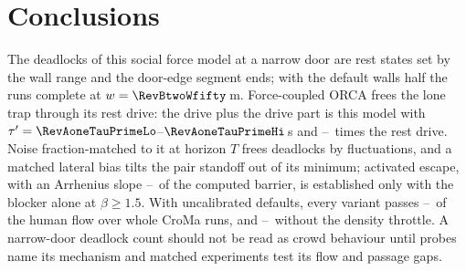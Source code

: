 \section{Conclusions}\label{sec:conclusions}
The deadlocks of this social force model at a narrow door are rest states set by the wall range and the door-edge segment ends; with the default walls half the runs complete at $w=\RevBtwoWfifty$\,m. Force-coupled ORCA frees the lone trap through its rest drive: the drive plus the drive part is this model with $\tau'=\RevAoneTauPrimeLo$--$\RevAoneTauPrimeHi$\,s and \RevAoneDriveRatioLo--\RevAoneDriveRatioHi\ times the rest drive. Noise fraction-matched to it at horizon $T$ frees deadlocks by fluctuations, and a matched lateral bias tilts the pair standoff out of its minimum; activated escape, with an Arrhenius slope \RvAthreeRatioDeep--\RvAthreeRatioMid\ of the computed barrier, is established only with the blocker alone at $\beta\ge1.5$. With uncalibrated defaults, every variant passes \RevDThreeRatioMin--\RevDThreeRatioMax\ of the human flow over whole CroMa runs, and \RvBoneCroOffMin--\RvBoneCroOffMax\ without the density throttle. A narrow-door deadlock count should not be read as crowd behaviour until probes name its mechanism and matched experiments test its flow and passage gaps.
